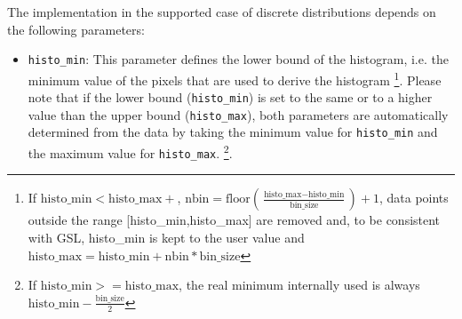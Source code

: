 The \HDRL implementation in the supported case of discrete
distributions depends on the following parameters:

\begin{itemize}
\item \verb+histo_min+: This parameter defines the lower bound of the
  histogram, i.e. the minimum value of the pixels that are used to
  derive the histogram
  \footnote{\label{footnote1}If $\mbox{histo\_min} < \mbox{histo\_max}+$,
  $\mbox{nbin} = \mbox{floor}(\frac{\mbox{histo\_max}-\mbox{histo\_min}}{\mbox{bin\_size}})+1$,
  data points outside the range [histo\_min,histo\_max] are removed and,
    to be consistent with GSL,  \mbox{histo\_min} is kept to the user value and
  $\mbox{histo\_max} = \mbox{histo\_min} + \mbox{nbin} * \mbox{bin\_size}$}.
    Please note that
  if the lower bound (\verb+histo_min+) is set to the same or to a
  higher value than the upper bound (\verb+histo_max+), both
  parameters are automatically determined from the data by taking the
  minimum value for \verb+histo_min+ and the maximum value for
  \verb+histo_max+.
  \footnote{\label{footnote2}If $\mbox{histo\_min} >= \mbox{histo\_max}$,
  the real minimum internally
  used is always $\mbox{histo\_min} - \frac{\mbox{bin\_size}}{2}$}.


\end{itemize}
